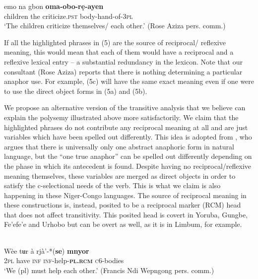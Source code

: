 \documentclass[output=paper]{langsci/langscibook}
\begin{document}
\ex
\gll emo    na    gbon     \textbf{oma-obo-rẹ-ayen} \\
       children  the  criticize.\textsc{pst}   body-hand-of-\textsc{3pl}\\
\glt   ‘The children criticize themselves/ each other.’ (Rose Aziza pers. comm.)
\z
\z

If all the highlighted phrases in (5) are the source of reciprocal/ reflexive meaning, this would mean that each of them would have a reciprocal and a reflexive lexical entry – a substantial redundancy in the lexicon. Note that our consultant (Rose Aziza) reports that there is nothing determining a particular anaphor use. For example, (5c) will have the same exact meaning even if one were to use the direct object forms in (5a) and (5b). 

  We propose an alternative version of the transitive analysis that we believe can explain the polysemy illustrated above more satisfactorily. We claim that the highlighted phrases do not contribute any reciprocal meaning at all and are just variables which have been spelled out differently. This idea is adopted from \citet{Safir2014}, who argues that there is universally only one abstract anaphoric form in natural language, but the “one true anaphor” can be spelled out differently depending on the phase in which its antecedent is found. Despite having no reciprocal/reflexive meaning themselves, these variables are merged as direct objects in order to satisfy the c-selectional needs of the verb. This is what we claim is also happening in these Niger-Congo languages. The source of reciprocal meaning in these constructions is, instead, posited to be a reciprocal marker (RCM) head that does not affect transitivity. This posited head is covert in Yoruba, Gungbe, Fe'efe'e and Urhobo but can be overt as well, as it is in Limbum, for example.


\ea\label{ex:}
\\
\gll Wèe  tʉr  à  rjà’-*(\textbf{se})    \textbf{{mnyor}} \\
\textsc{2pl}  have  \textsc{inf}  \textsc{inf}-help-\textbf{\textsc{pl.rcm}}  \textsc{c}6-bodies \\
\glt ‘We (pl) must help each other.’ {(}Francis Ndi Wepngong pers. comm.{)} 
\z
\end{document}
